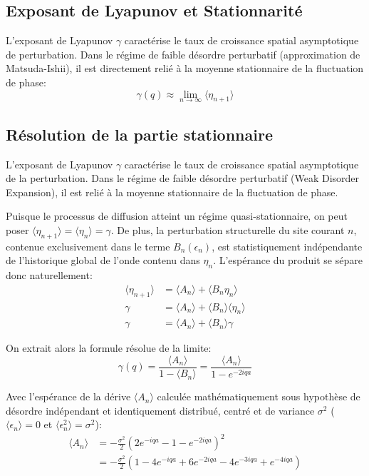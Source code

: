 \subsection{Exposant de Lyapunov et Stationnarité}
L'exposant de Lyapunov $\gamma$ caractérise le taux de croissance spatial asymptotique de perturbation. Dans le régime de faible désordre perturbatif (approximation de Matsuda-Ishii), il est directement relié à la moyenne stationnaire de la fluctuation de phase:
\begin{equation*}
    \gamma(q) \approx \lim_{n \to \infty} \langle \eta_{n+1} \rangle
\end{equation*}

\subsection{Résolution de la partie stationnaire}
L'exposant de Lyapunov $\gamma$ caractérise le taux de croissance spatial asymptotique de la perturbation. Dans le régime de faible désordre perturbatif (Weak Disorder Expansion), il est relié à la moyenne stationnaire de la fluctuation de phase.

Puisque le processus de diffusion atteint un régime quasi-stationnaire, on peut poser $\langle \eta_{n+1} \rangle = \langle \eta_n \rangle = \gamma$.
De plus, la perturbation structurelle du site courant $n$, contenue exclusivement dans le terme $B_n(\epsilon_n)$, est statistiquement indépendante de l'historique global de l'onde contenu dans $\eta_n$. L'espérance du produit se sépare donc naturellement:
\begin{align*}
    \langle \eta_{n+1} \rangle &= \langle A_n \rangle + \langle B_n \eta_n \rangle \\
    \gamma &= \langle A_n \rangle + \langle B_n \rangle \langle \eta_n \rangle \\
    \gamma &= \langle A_n \rangle + \langle B_n \rangle \gamma
\end{align*}

On extrait alors la formule résolue de la limite:
\begin{equation*}
    \gamma(q) = \frac{\langle A_n \rangle}{1 - \langle B_n \rangle} = \frac{\langle A_n \rangle}{1 - e^{-2iqa}}
\end{equation*}

Avec l'espérance de la dérive $\langle A_n \rangle$ calculée mathématiquement sous hypothèse de désordre indépendant et identiquement distribué, centré et de variance $\sigma^2$ ($\langle \epsilon_n \rangle = 0$ et $\langle \epsilon_n^2 \rangle = \sigma^2$):
\begin{align*}
    \langle A_n \rangle &= - \frac{\sigma^2}{2} {\left(2e^{-iqa} - 1 - e^{-2iqa}\right)}^2 \\
    &= - \frac{\sigma^2}{2} \left( 1 - 4e^{-iqa} + 6e^{-2iqa} - 4e^{-3iqa} + e^{-4iqa} \right)
\end{align*}

